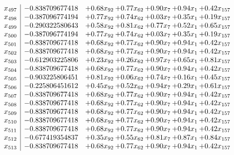 \documentclass[8pt]{article}
\begin{document}
\[\begin{array}{c| c c@{\hskip 2pt} c@{\hskip 2pt} c@{\hskip 2pt} c@{\hskip 2pt} c@{\hskip 2pt} }
 x_{497}   &  -0.838709677418 & +  0.68 x_{92} & +  0.77 x_{62} & +  0.90 x_{7} & +  0.94 x_{1} & +  0.42 x_{157}\\
 x_{498}   &  -0.387096774194 & +  0.77 x_{92} & +  0.74 x_{62} & +  0.03 x_{7} & +  0.35 x_{1} & +  0.19 x_{157}\\
 x_{499}   &  -0.290322580643 & +  0.58 x_{92} & +  0.81 x_{62} & +  0.77 x_{7} & +  0.52 x_{1} & +  0.65 x_{157}\\
 x_{500}   &  -0.387096774194 & +  0.77 x_{92} & +  0.74 x_{62} & +  0.03 x_{7} & +  0.35 x_{1} & +  0.19 x_{157}\\
 x_{501}   &  -0.838709677418 & +  0.68 x_{92} & +  0.77 x_{62} & +  0.90 x_{7} & +  0.94 x_{1} & +  0.42 x_{157}\\
 x_{502}   &  -0.838709677418 & +  0.68 x_{92} & +  0.77 x_{62} & +  0.90 x_{7} & +  0.94 x_{1} & +  0.42 x_{157}\\
 x_{503}   &  -0.612903225806 & +  0.23 x_{92} & +  0.26 x_{62} & +  0.97 x_{7} & +  0.65 x_{1} & +  0.81 x_{157}\\
 x_{504}   &  -0.838709677418 & +  0.68 x_{92} & +  0.77 x_{62} & +  0.90 x_{7} & +  0.94 x_{1} & +  0.42 x_{157}\\
 x_{505}   &  -0.903225806451 & +  0.81 x_{92} & +  0.06 x_{62} & +  0.74 x_{7} & +  0.16 x_{1} & +  0.45 x_{157}\\
 x_{506}   &  -0.225806451612 & +  0.45 x_{92} & +  0.52 x_{62} & +  0.94 x_{7} & +  0.29 x_{1} & +  0.61 x_{157}\\
 x_{507}   &  -0.838709677418 & +  0.68 x_{92} & +  0.77 x_{62} & +  0.90 x_{7} & +  0.94 x_{1} & +  0.42 x_{157}\\
 x_{508}   &  -0.838709677418 & +  0.68 x_{92} & +  0.77 x_{62} & +  0.90 x_{7} & +  0.94 x_{1} & +  0.42 x_{157}\\
 x_{509}   &  -0.838709677418 & +  0.68 x_{92} & +  0.77 x_{62} & +  0.90 x_{7} & +  0.94 x_{1} & +  0.42 x_{157}\\
 x_{510}   &  -0.838709677418 & +  0.68 x_{92} & +  0.77 x_{62} & +  0.90 x_{7} & +  0.94 x_{1} & +  0.42 x_{157}\\
 x_{511}   &  -0.838709677418 & +  0.68 x_{92} & +  0.77 x_{62} & +  0.90 x_{7} & +  0.94 x_{1} & +  0.42 x_{157}\\
 x_{512}   &  -0.677419354837 & +  0.35 x_{92} & +  0.55 x_{62} & +  0.81 x_{7} & +  0.87 x_{1} & +  0.84 x_{157}\\
 x_{513}   &  -0.838709677418 & +  0.68 x_{92} & +  0.77 x_{62} & +  0.90 x_{7} & +  0.94 x_{1} & +  0.42 x_{157}\\

\end{array}\]
\end{document}
